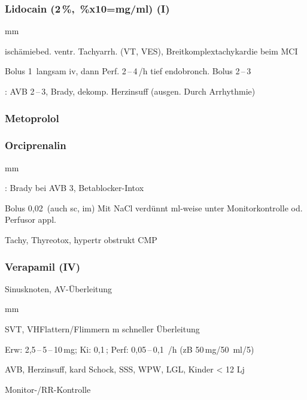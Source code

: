 \subsubsection{Lidocain (2\,\%, \,\%x10=mg/ml) (\textrm{I})}
\begin{labeling}[:]{mm}
  \item[In] ischämiebed. ventr. Tachyarrh. (VT, VES),
  Breitkomplextachykardie beim MCI
  \item[Rx]Bolus 1\, langsam iv, dann Perf.
  2\,--\,4\,/h\newline
  tief endobronch. Bolus 2\,--\,3\,
  \item[KI] : AVB 2\,--\,3{\textdegree}, Brady, dekomp. Herzinsuff
  (ausgen. Durch Arrhythmie)
\end{labeling}



\subsubsection{Metoprolol}


\subsubsection{Orciprenalin}

\begin{labeling}[:]{mm}
  \item[In]
  \item[In]: Brady bei AVB 3{\textdegree}, Betablocker-Intox
  \item[Rx] Bolus 0,02\, (auch sc, im)\newline
  Mit NaCl verdünnt ml-weise unter Monitorkontrolle od. Perfusor appl.
  \item[KI]  Tachy, Thyreotox, hypertr obstrukt CMP
\end{labeling}

\subsubsection{Verapamil (\textrm{IV})}


Sinusknoten, AV-Überleitung

\begin{labeling}[:]{mm}\item[In] \item[KI] SVT,
VHFlattern/Flimmern m schneller Überleitung

\item[Rx] Erw: 2,5\,--\,5\,--\,10\,mg; Ki: 0,1\,; Perf:
0,05\,--\,0,1 \,/h (zB 50\,mg/50\,	ml/5)

\item[KI]  AVB, Herzinsuff, kard Schock, SSS, WPW, LGL, Kinder {\textless} 12
Lj


Monitor-/RR-Kontrolle

\end{labeling}

